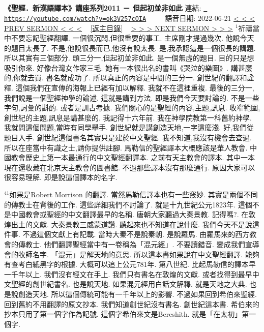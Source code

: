\documentclass{book}
\begin{document}
\section{}
\label{sec:ok3V257cOIA}
\textbf{《聖經．新漢語譯本》講座系列2011 － 但起初並非如此}
\newline
\newline
連結: \href{https://youtube.com/watch?v=ok3V257cOIA}{\texttt{ https://youtube.com/watch?v=ok3V257cOIA}} ~~~~ 語音日期: 2022-06-21 
\newline
\newline
\hyperref[sec:FbD104WC_Bk]{\small{< < < PREV SERMON < < <}}
~
\hyperref[sec:index]{\small{[返主目錄]}}
~
\hyperref[sec:9gWlq_OvVJU]{\small{> > > NEXT SERMON > > >}}
\newline
\newline
$^{1}$祈禱當中不要忘記聖經翻譯.
一個很沉悶,但很重要的事工.
主席剛才提過幾次.
他說今天的題目太長了.
不是,他說很長而已,他沒有說太長.
是,我承認這是一個很長的講題.
所以其實有三個部分.
頭三分一,但起初並非如此.
是一個無虛的題目.
目的只是想吸引你來.
好像台灣女作家三毛.
她有一本很出名的書叫《哭泣的樂圖》.
講甚麼的,你就去買.
書名就成功了.
所以真正的內容是中間的三分一.
創世紀的翻譯和詮釋.
這個我們在宣傳的海報上已經有加以解釋.
我就不在這裡重複.
最後的三分一,我們說是一個聖經神學的論述.
這就是講到方法.
即是我們今天要討論的.
不是一些字句,詞彙的斟酌.
或者是訓古考據.
我們關心的是聖經的內容,主題,訊息.
收窄範圍,創世紀的主題,訊息是講甚麼的.
我記得十六年前.
我在神學院教第一科舊約神學.
我就問這個問題,當時有同學舉手.
創世紀就是講創造天地,一字這麼淺.
好,我們從題目入手.
創世紀這個書名其實只是建於中文聖經.
我不知道,我沒有機會去查過.
所以在座當中有識之士,請你提供註腳.
馬勒信的聖經譯本大概應該是華人教會.
中國教會歷史上第一本最通行的中文聖經翻譯本.
之前有天主教會的譯本.
其中一本現在還收藏在北京天主教會的圖書館.
不過那些譯本沒有那麼通行.
原因大家可以很容易理解.
即是說這個譯本的名字.

$^{41}$如果是Robert Morrison 的翻譯.
當然馬勒信譯本也有一些竅妙.
其實是兩個不同的傳教士在背後的工作.
這些詳細我們不討論了.
就是十九世紀公元1823年.
這個不是中國教會或聖經的中文翻譯最早的名稱.
唐朝大家聽過大秦景教.
記得嗎?.
在敦煌出土的文獻.
大秦景教三威蒙道讚.
聽起來也不知道在說什麼.
我們今天不是說這件事.
不過這個文獻上有記載.
當時大秦不是說秦朝.
是說羅馬.
由羅馬來的西方教會的傳教士.
他們翻譯聖經當中有一卷稱為「混元經」.
不要讀錯音.
變成我們宣導會的牧師名字.
「混元」是解天地的意思.
所以這本書如果說在中文聖經翻譯.
能夠有查考白紙黑字的根據.
大概可以追上公元781年.
第八世紀.
比起馬勒信的譯本早一千年以上.
我們沒有經文在手上.
我們只有書名在敦煌的文獻.
或者找得到最早中文聖經的創世紀書名.
也是說天地.
如果混元經用白話文解釋.
就是天地之大典.
也是說創造天地.
所以這個傳統可能有一千年以上的影響.
不過如果回到希伯來聖經.
回到舊約不用翻譯的原文抄本.
我們知道創世紀沒有書名.
創世紀這本書.
希伯來的抄本只用了第一個字作為記號.
這個字希伯來文是Bereshith.
就是「在太初」第一個字.
\end{document}

